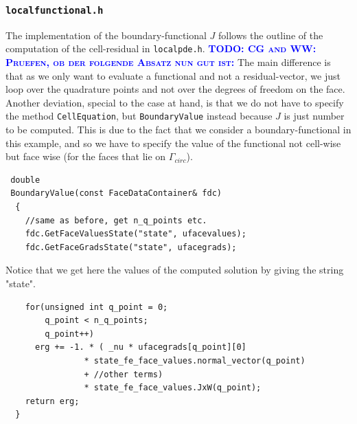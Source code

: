 \documentclass[smallextended]{svjour3}       %
\numberwithin{equation}{section}
\newcommand{\todo}[1]{\textbf{\textsc{\textcolor{blue}{TODO: #1}}}}
\begin{document}
\subsubsection{\texttt{localfunctional.h}}
The implementation of the boundary-functional $J$ follows the outline of the
computation of the cell-residual in \texttt{localpde.h}. 
\todo{CG and WW: Pruefen, ob der folgende Absatz nun gut ist:}
The main difference is that as we only want to evaluate a functional and not a
residual-vector, we just loop over the quadrature points and not over the
degrees of freedom on the face. Another deviation, special to the case at
hand, is that we do not have to specify the method \texttt{CellEquation}, but
\texttt{BoundaryValue} instead because $J$ is just number to be computed. This is due to the fact that we consider a boundary-functional in this example, and so we have to specify the value of the functional not cell-wise but face wise (for the faces that lie on $\Gamma_{circ}$). 



\begin{lstlisting}
 double
 BoundaryValue(const FaceDataContainer& fdc)
  {
    //same as before, get n_q_points etc.
    fdc.GetFaceValuesState("state", ufacevalues);
    fdc.GetFaceGradsState("state", ufacegrads);
\end{lstlisting}
Notice that we get here the values of the computed solution by giving the string "state".
\begin{lstlisting}
    for(unsigned int q_point = 0; 
        q_point < n_q_points; 
        q_point++)
      erg += -1. * ( _nu * ufacegrads[q_point][0]
                * state_fe_face_values.normal_vector(q_point)
                + //other terms)        
                * state_fe_face_values.JxW(q_point);
    return erg;
  }
\end{lstlisting}
\end{document}
